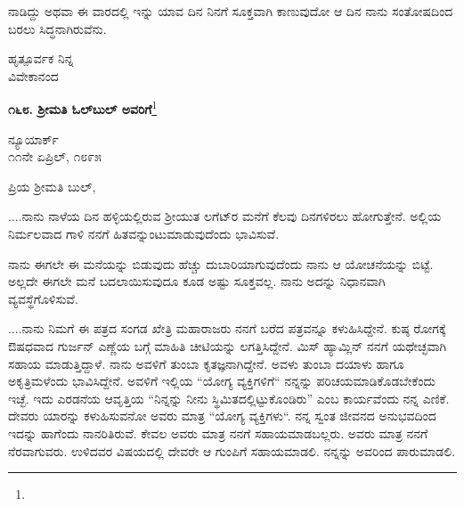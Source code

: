 ನಾಡಿದ್ದು ಅಥವಾ ಈ ವಾರದಲ್ಲಿ ಇನ್ನು ಯಾವ ದಿನ ನಿನಗೆ ಸೂಕ್ತವಾಗಿ ಕಾಣುವುದೋ ಆ ದಿನ ನಾನು ಸಂತೋಷದಿಂದ ಬರಲು ಸಿದ್ಧನಾಗಿರುವೆನು.

{\flushright
ಹೃತ್ಪೂರ್ವಕ ನಿನ್ನ\\ವಿವೇಕಾನಂದ\par}
\eject

\begin{center}
\textbf{೧೬೮. ಶ‍್ರೀಮತಿ ಓಲ್‌ಬುಲ್‌ ಅವರಿಗೆ}\footnote{}
\end{center}

\begin{flushright}
ನ್ಯೂಯಾರ್ಕ್\\೧೧ನೇ ಏಪ್ರಿಲ್, ೧೮೯೫
\end{flushright}

\noindent
ಪ್ರಿಯ ಶ‍್ರೀಮತಿ ಬುಲ್,

\vspace{0.15cm}

....ನಾನು ನಾಳೆಯ ದಿನ ಹಳ್ಳಿಯಲ್ಲಿರುವ ಶ‍್ರೀಯುತ ಲಗೆಟ್‌ರ ಮನೆಗೆ ಕೆಲವು ದಿನಗಳಿರಲು ಹೋಗುತ್ತೇನೆ. ಅಲ್ಲಿಯ ನಿರ್ಮಲವಾದ ಗಾಳಿ ನನಗೆ ಹಿತವನ್ನುಂಟುಮಾಡುವುದೆಂದು ಭಾವಿಸುವೆ.

\vspace{0.15cm}

ನಾನು ಈಗಲೇ ಈ ಮನೆಯನ್ನು ಬಿಡುವುದು ಹೆಚ್ಚು ದುಬಾರಿಯಾಗುವುದೆಂದು ನಾನು ಆ ಯೋಚನೆಯನ್ನು ಬಿಟ್ಟೆ. ಅಲ್ಲದೇ ಈಗಲೇ ಮನೆ ಬದಲಾಯಿಸುವುದೂ ಕೂಡ ಅಷ್ಟು ಸೂಕ್ತವಲ್ಲ. ನಾನು ಅದನ್ನು ನಿಧಾನವಾಗಿ ವ್ಯವಸ್ಥೆಗೊಳಿಸುವೆ.

\vspace{0.15cm}

....ನಾನು ನಿಮಗೆ ಈ ಪತ್ರದ ಸಂಗಡ ಖೇತ್ರಿ ಮಹಾರಾಜರು ನನಗೆ ಬರೆದ ಪತ್ರವನ್ನೂ ಕಳುಹಿಸಿದ್ದೇನೆ. ಕುಷ್ಠ ರೋಗಕ್ಕೆ ಔಷಧವಾದ ಗುರ್ಜನ್ ಎಣ್ಣೆಯ ಬಗ್ಗೆ ಮಾಹಿತಿ ಚೀಟಿಯನ್ನು ಲಗತ್ತಿಸಿದ್ದೇನೆ. ಮಿಸ್ ಹ್ಯಾಮ್ಲಿನ್ ನನಗೆ ಯಥೇಚ್ಛವಾಗಿ ಸಹಾಯ ಮಾಡುತ್ತಿದ್ದಾಳೆ. ನಾನು ಅವಳಿಗೆ ತುಂಬಾ ಕೃತಜ್ಞನಾಗಿದ್ದೇನೆ. ಅವಳು ತುಂಬಾ ದಯಾಳು ಹಾಗೂ ಅಕೃತ್ರಿಮಳೆಂದು ಭಾವಿಸಿದ್ದೇನೆ. ಅವಳಿಗೆ ಇಲ್ಲಿಯ “ಯೋಗ್ಯ ವ್ಯಕ್ತಿಗಳಿಗೆ“ ನನ್ನನ್ನು ಪರಿಚಯಮಾಡಿಕೊಡಬೇಕೆಂದು ಇಚ್ಛೆ. ಇದು ಎರಡನೆಯ ಆವೃತ್ತಿಯ “ನಿನ್ನನ್ನು ನೀನು ಸ್ಥಿಮಿತದಲ್ಲಿಟ್ಟುಕೊಂಡಿರು” ಎಂಬ ಕಾರ್ಯವೆಂದು ನನ್ನ ಎಣಿಕೆ. ದೇವರು ಯಾರನ್ನು ಕಳುಹಿಸುವನೋ ಅವರು ಮಾತ್ರ “ಯೋಗ್ಯ ವ್ಯಕ್ತಿಗಳು“. ನನ್ನ ಸ್ವಂತ ಜೀವನದ ಅನುಭವದಿಂದ ಇದನ್ನು ಹಾಗೆಂದು ನಾನರಿತಿರುವೆ. ಕೇವಲ ಅವರು ಮಾತ್ರ ನನಗೆ ಸಹಾಯಮಾಡಬಲ್ಲರು. ಅವರು ಮಾತ್ರ ನನಗೆ ನೆರವಾಗುವರು. ಉಳಿದವರ ವಿಷಯದಲ್ಲಿ ದೇವರೇ ಆ ಗುಂಪಿಗೆ ಸಹಾಯಮಾಡಲಿ. ನನ್ನನ್ನು ಅವರಿಂದ ಪಾರುಮಾಡಲಿ.

\vspace{0.15cm}

